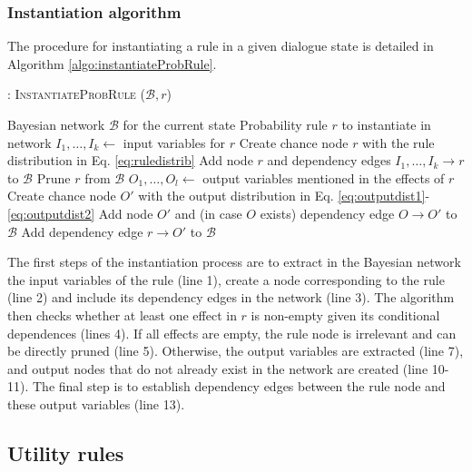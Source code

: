 \subsubsection*{Instantiation algorithm} 
\label{sec:utilruleinstantiation}

The procedure for instantiating a rule in a given dialogue state is detailed in Algorithm \ref{algo:instantiateProbRule}. 

\begin{algorithm}[h!]
\caption{: \textsc{InstantiateProbRule} ($\mathcal{B}, \mathit{r}$)}
\begin{algorithmic}[1] \vspace{1mm}
\REQUIRE Bayesian network $\mathcal{B}$ for the current state
\REQUIRE Probability rule $\mathit{r}$ to instantiate in network  \vspace{1mm}
\STATE $I_1, \dots, I_k \leftarrow$ input variables for $\mathit{r}$
\STATE Create chance node $r$ with the rule distribution in Eq. \eqref{eq:ruledistrib}
\STATE Add node $r$ and dependency edges $I_1, \dots, I_k \rightarrow r$ to $\mathcal{B}$ 
\STATE Prune $r$ from $\mathcal{B}$
\ELSE
\STATE $O_1, \dots, O_l \leftarrow$ output variables mentioned in the effects of $r$
\STATE Create chance node $O'$ with the output distribution in Eq. \eqref{eq:outputdist1}-\eqref{eq:outputdist2}
\STATE Add node $O'$ and (in case $O$ exists) dependency edge $O \rightarrow O'$ to $\mathcal{B}$
\ENDIF
\STATE Add dependency edge $r \rightarrow O'$ to $\mathcal{B}$ 
\ENDFOR
\ENDIF
\end{algorithmic}
\label{algo:instantiateProbRule}
\end{algorithm}

The first steps of the instantiation process are to extract in the Bayesian network the input variables of the rule (line 1), create a node corresponding to the rule (line 2) and include its dependency edges in the network (line 3).  The algorithm then checks whether at least one effect in $r$ is non-empty given its conditional dependences (lines 4).  If all effects are empty, the rule node is irrelevant and can be directly pruned (line 5). Otherwise, the output variables are extracted (line 7), and output nodes that do not already exist in the network are created (line 10-11). The final step is to establish dependency edges between the rule node and these output variables (line 13).


\subsection{Utility rules}

